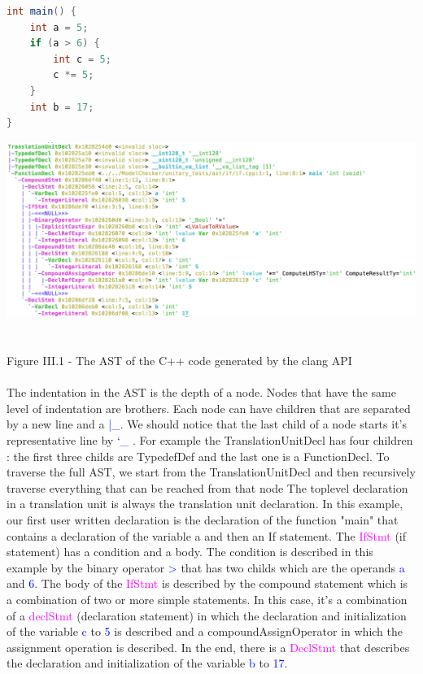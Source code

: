 \documentclass{report}
\begin{document}
\begin{lstlisting}[language=java]
int main() {
    int a = 5;
    if (a > 6) {
        int c = 5;
        c *= 5;
    }
    int b = 17;
}
\end{lstlisting}
\begin{center}
\includegraphics[scale=0.6]{data/ifClang.png}
~\\~\\Figure III.1 - The AST of the C++ code generated by the clang API
\end{center}

\paragraph{}
\hspace{4mm}
The indentation in the AST is the depth of a node. Nodes that have
the same level of indentation are brothers. Each node can have 
children that are separated by a new line and a \textcolor{blue}{|\_}. 
We should notice
that the last child of a node starts it's representative line by \textcolor{blue}{`\_}
.  For example the \textcolor{oliveGreen}{TranslationUnitDecl} has four children :
the first three childs are \textcolor{oliveGreen}{TypedefDef} and
 the last one is a \textcolor{oliveGreen}{FunctionDecl}.
To traverse the full AST, we start from the \textcolor{oliveGreen}{TranslationUnitDecl}
 and then recursively traverse everything 
that can be reached from that node
The toplevel declaration in a translation unit is always the
 translation unit declaration. 
In this example, our first user written declaration 
is the declaration of the function "main" that contains
a declaration of the variable a and then an If statement.
The \textcolor{magenta}{IfStmt} (if statement) has a condition and a body. The condition is 
described in this example by the binary operator \textcolor{blue}{>} that has two
childs which are the operands \textcolor{blue}{a} and \textcolor{blue}{6}. 
The body of the \textcolor{magenta}{IfStmt} is described by the compound statement which is 
a combination of two or more simple statements. In this case, it's 
a combination of a \textcolor{magenta}{declStmt} (declaration statement) in which the declaration and 
initialization of  the variable \textcolor{blue}{c} to \textcolor{blue}{5} 
is described and a compoundAssignOperator 
in which the assignment operation is described.
In the end, there is a \textcolor{magenta}{DeclStmt} that describes the declaration and initialization
of the variable \textcolor{blue}{b} to \textcolor{blue}{17}.
\end{document}
